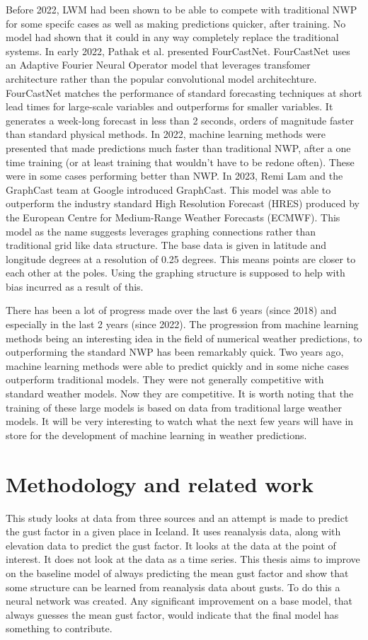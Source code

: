 Before 2022, LWM had been shown to be able to compete with traditional NWP for some specifc cases as well as making predictions quicker, after training. No model had shown that it could in any way completely replace the traditional systems. In early 2022, Pathak et al.\cite{FourCastNet} presented FourCastNet. FourCastNet uses an Adaptive Fourier Neural Operator model that leverages transfomer architecture rather than the popular convolutional model architechture. FourCastNet matches the performance of standard forecasting techniques at short lead times for large-scale variables and outperforms for smaller variables. It generates a week-long forecast in less than 2 seconds, orders of magnitude faster than standard physical methods\cite{FourCastNet}. In 2022, machine learning methods were presented that made predictions much faster than traditional NWP, after a one time training (or at least training that wouldn't have to be redone often). These were in some cases performing better than NWP. In 2023, Remi Lam and the GraphCast team at Google introduced GraphCast. This model was able to outperform the industry standard High Resolution Forecast (HRES) produced by the European Centre for Medium-Range Weather Forecasts (ECMWF). This model as the name suggests leverages graphing connections rather than traditional grid like data structure. The base data is given in latitude and longitude degrees at a resolution of 0.25 degrees. This means points are closer to each other at the poles. Using the graphing structure is supposed to help with bias incurred as a result of this\cite{GraphCast}.

There has been a lot of progress made over the last 6 years (since 2018) and especially in the last 2 years (since 2022)\cite{SecondRevolution}. The progression from machine learning methods being an interesting idea in the field of numerical weather predictions, to outperforming the standard NWP has been remarkably quick. Two years ago, machine learning methods were able to predict quickly and in some niche cases outperform traditional models. They were not generally competitive with standard weather models. Now they are competitive. It is worth noting that the training of these large models is based on data from traditional large weather models. It will be very interesting to watch what the next few years will have in store for the development of machine learning in weather predictions.

\section{Methodology and related work}
This study looks at data from three sources and an attempt is made to predict the gust factor in a given place in Iceland. It uses reanalysis data, along with elevation data to predict the gust factor. It looks at the data at the point of interest. It does not look at the data as a time series. This thesis aims to improve on the baseline model of always predicting the mean gust factor and show that some structure can be learned from reanalysis data about gusts. To do this a neural network was created. Any significant improvement on a base model, that always guesses the mean gust factor, would indicate that the final model has something to contribute.

